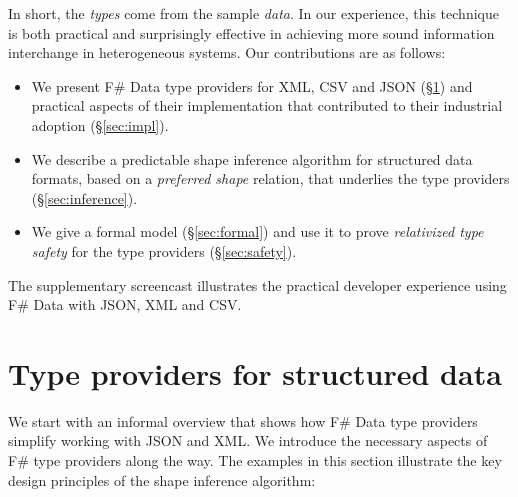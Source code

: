 \documentclass[10pt,preprint,clearpagebib]{sigplanconf}
\begin{document}
In short, the \emph{types} come from the sample \emph{data}. In our experience, this technique is 
both practical and surprisingly effective in achieving more sound information interchange 
in heterogeneous systems. Our contributions are as follows:

\begin{itemize}
\item We present F\# Data type providers for XML, CSV and JSON (\S\ref{sec:providers}) 
  and practical aspects of their implementation that contributed to their industrial 
  adoption (\S\ref{sec:impl}). 

\item We describe a predictable shape inference algorithm for structured data formats, 
  based on a \emph{preferred shape} relation, that underlies the type providers 
  (\S\ref{sec:inference}).

\item We give a formal model (\S\ref{sec:formal}) and use it to prove
  \emph{relativized type safety} for the type providers (\S\ref{sec:safety}).
\end{itemize}

\vspace{-0.1em}
\noindent
The supplementary screencast illustrates the practical developer experience using 
  F\# Data with JSON, XML and CSV.


%
%

\section{Type providers for structured data}
\label{sec:providers}

We start with an informal overview that shows how F\# Data type providers simplify working with 
JSON and XML. We introduce the necessary aspects of F\# type providers along the way. The examples 
in this section illustrate the key design principles of the shape inference algorithm:
\end{document}
